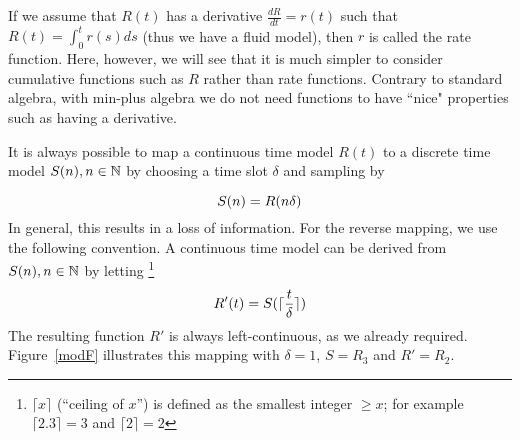 \begin{figure}[htbp]
 \vspace{1.5cm} 
\end{figure}

If we assume that $R(t)$ has a derivative $\frac{dR}{dt}=r(t)$
such that $R(t)=\int_{0}^t r(s) ds$ (thus we have a fluid model),
then $r$ is called the rate function. Here, however, we will see
that it is much simpler to consider cumulative functions such as
$R$ rather than rate functions. Contrary to standard algebra, with
min-plus algebra we do not need functions to have ``nice"
properties such as having a derivative.

It is always possible to map a continuous time model $R(t)$ to a
discrete time model $S(n), n \in \mathbb{N}$ by choosing a time slot
$\delta$ and sampling by

\begin{equation} \mylabel{eq-map-samp}
  S(n) = R( n \delta)
\end{equation}
In general, this results in a loss of information. For the reverse
mapping, we use the following convention. A continuous time model
can be derived from
$S(n), n \in \mathbb{N}$ by letting%
\footnote{$\lceil x \rceil$ (``ceiling of $x$'')
is defined as the smallest integer $\geq x$;
for example $\lceil 2.3\rceil = 3$ and
$\lceil 2\rceil = 2$}%
\begin{equation} \mylabel{eq-map-inter}
 R'(t)= S(\lceil
\frac{t}{\delta}\rceil)
\end{equation}
The resulting function $R'$ is
always left-continuous, as we already required. Figure~\ref{modF} illustrates this
mapping with $\delta = 1$, $S=R_3$ and $R'=R_2$.

